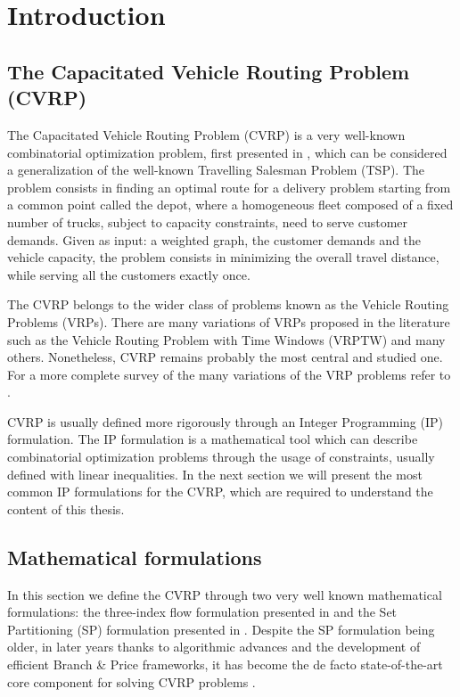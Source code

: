 \chapter{Introduction}

\section{The Capacitated Vehicle Routing Problem (CVRP)}
\label{sec:intro-cvrp-problem}

The Capacitated Vehicle Routing Problem (CVRP) is a very well-known combinatorial optimization problem,
first presented in \textcite{dantzig1959truck},
which can be considered a generalization of the well-known Travelling Salesman Problem (TSP).
The problem consists in finding an optimal route for a delivery problem
starting from a common point called the depot,
where a homogeneous fleet composed of a fixed number of trucks, subject to capacity constraints,
need to serve customer demands.
Given as input: a weighted graph, the customer demands and the vehicle capacity,
the problem consists in minimizing the overall travel distance,
while serving all the customers exactly once.

The CVRP belongs to the wider class of problems known as the Vehicle Routing Problems (VRPs).
There are many variations of VRPs proposed in the literature such as
the Vehicle Routing Problem with Time Windows (VRPTW) and many others.
Nonetheless, CVRP remains probably the most central and studied one.
For a more complete survey of the many variations of the VRP problems refer to \cite{poggi2014chapter}.


CVRP is usually defined more rigorously through an Integer Programming (IP) formulation.
The IP formulation is a mathematical tool which can describe combinatorial optimization problems
through the usage of constraints, usually defined with linear inequalities.
In the next section we will present the most common IP formulations for the CVRP, which
are required to understand the content of this thesis.

\section{Mathematical formulations}
\label{sec:intro-cvrp-mathematical-formulations}


In this section we define the CVRP through two very well known mathematical formulations:
the three-index flow formulation presented in \textcite{toth_vehicle_2002} and
the Set Partitioning (SP) formulation presented in \textcite{balinski1964integer}.
Despite the SP formulation being older, in later years thanks to algorithmic advances
and the development of efficient Branch \& Price frameworks, it has become the de facto
state-of-the-art core component for solving CVRP problems \parencite{pessoa2020generic}.

